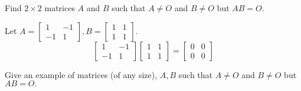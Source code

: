 \documentclass{ximera}
\begin{document}
\begin{problem}\label{prb:4.18} Find $2 \times 2$ matrices $A$ and $B$ such that $A \neq O$ and $B \neq O$ but $AB = O$.
\begin{hint}
Let $A = \left[
\begin{array}{rr}
1 & -1 \\
-1 & 1
\end{array}
\right], B = \left[
\begin{array}{cc}
1 & 1 \\
1 & 1
\end{array}
\right].$
\[
\left[
\begin{array}{rr}
1 & -1 \\
-1 & 1
\end{array}
\right] \left[
\begin{array}{cc}
1 & 1 \\
1 & 1
\end{array}
\right] = \left[
\begin{array}{cc}
0 & 0 \\
0 & 0
\end{array}
\right]
\]
\end{hint}
\end{problem}

\begin{problem}\label{prb:4.19} Give an example of matrices (of any size), $A,B$ such that $A \neq O$ and $B \neq O$ but  $AB=O.$
\end{problem}
\end{document}
